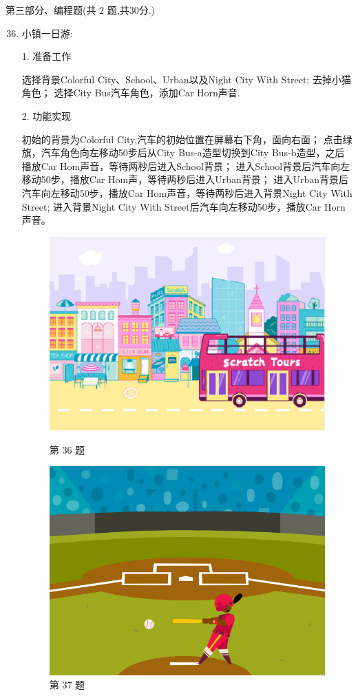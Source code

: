 \documentclass[10pt, a4paper]{article}
\begin{document}
    \newpage
    {\noindent\heiti 第三部分、编程题(共 2 题,共30分.)}
    \begin{enumerate}
        \setcounter{enumi}{35}
        
        \item 小镇一日游:
        
        1. 准备工作
        \begin{tasks}[label = (\arabic*)]
            \task 选择背景Colorful City、School、Urban以及Night City With Street;
            \task 去掉小猫角色；
            \task 选择City Bus汽车角色，添加Car Horn声音.
        \end{tasks}
        2. 功能实现
        \begin{tasks}[label = (\arabic*)]
            \task 初始的背景为Colorful City,汽车的初始位置在屏幕右下角，面向右面；
            \task 点击绿旗，汽车角色向左移动50步后从City Bus-a造型切换到City Bus-b造型，之后播放Car Hom声音，等待两秒后进入School背景；
            \task 进入School背景后汽车向左移动50步，播放Car Hom声，等待两秒后进入Urban背景；
            \task 进入Urban背景后汽车向左移动50步，播放Car Hom声音，等待两秒后进入背景Night City With Street;
            \task 进入背景Night City With Street后汽车向左移动50步，播放Car Horn声音。
        \end{tasks}
        \begin{figure}[htbp]
            \begin{minipage}[t]{.48\textwidth}
                \centering
                \includegraphics[width=.6\textwidth]{36.png}
                \caption*{第 36 题}
            \end{minipage}
            \begin{minipage}[t]{.48\textwidth}
                \centering
                \includegraphics[width=.6\textwidth]{37.png}
                \caption*{第 37 题}
            \end{minipage}
        \end{figure}
                


\end{enumerate}
\end{document}
